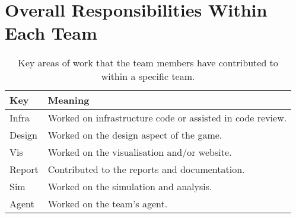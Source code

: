 \section{Overall Responsibilities Within Each Team}
\label{sec:roles_appendix:individual}


\begin{table}[!h]
    \centering
    \begin{tabular}{|l|l|}
    \hline
    \textbf{Key}    & \textbf{Meaning}                               \\ \hline
    Infra  & Worked on infrastructure code or assisted in code review. \\
    Design & Worked on the design aspect of the game.                         \\
    Vis    & Worked on the visualisation and/or website.                      \\
    Report & Contributed to the reports and documentation.                       \\
    Sim    & Worked on the simulation and analysis.                    \\
    Agent  & Worked on the team's agent.                                 \\ \hline
    \end{tabular}
    \caption{Key areas of work that the team members have contributed to within a specific team.}
    \label{table:roles_exp:teams}
    \end{table}








